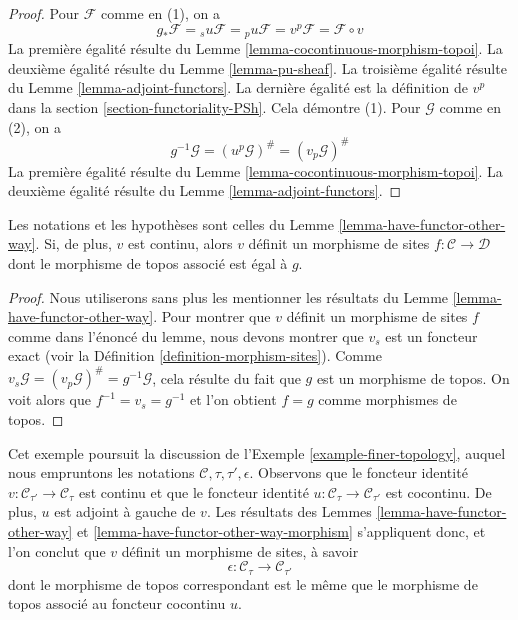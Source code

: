 \begin{proof}
Pour $\mathcal{F}$ comme en (1), on a
$$
g_*\mathcal{F} =
{}_su\mathcal{F} =
{}_pu\mathcal{F} =
v^p\mathcal{F} =
\mathcal{F} \circ v
$$
La première égalité résulte du Lemme \ref{lemma-cocontinuous-morphism-topoi}.
La deuxième égalité résulte du Lemme \ref{lemma-pu-sheaf}.
La troisième égalité résulte du Lemme \ref{lemma-adjoint-functors}.
La dernière égalité est la définition de $v^p$ dans la
section \ref{section-functoriality-PSh}. Cela démontre (1).
Pour $\mathcal{G}$ comme en (2), on a
$$
g^{-1}\mathcal{G} = (u^p\mathcal{G})^\# = (v_p\mathcal{G})^\#
$$
La première égalité résulte du Lemme \ref{lemma-cocontinuous-morphism-topoi}.
La deuxième égalité résulte du Lemme \ref{lemma-adjoint-functors}.
\end{proof}

\begin{lemma}
\label{lemma-have-functor-other-way-morphism}
Les notations et les hypothèses sont celles du
Lemme \ref{lemma-have-functor-other-way}.
Si, de plus, $v$ est continu, alors $v$ définit un morphisme de sites
$f : \mathcal{C} \to \mathcal{D}$ dont le morphisme de topos associé est égal
à $g$.
\end{lemma}

\begin{proof}
Nous utiliserons sans plus les mentionner les résultats du
Lemme \ref{lemma-have-functor-other-way}. Pour montrer que $v$ définit un
morphisme de sites $f$ comme dans l’énoncé du lemme, nous devons montrer que
$v_s$ est un foncteur exact (voir la
Définition \ref{definition-morphism-sites}). Comme
$v_s\mathcal{G} = (v_p\mathcal{G})^\# = g^{-1}\mathcal{G}$, cela résulte du
fait que $g$ est un morphisme de topos. On voit alors que
$f^{-1} = v_s = g^{-1}$ et l’on obtient $f = g$ comme morphismes de topos.
\end{proof}

\begin{example}
\label{example-finer-topology-bis}
Cet exemple poursuit la discussion de l’Exemple \ref{example-finer-topology},
auquel nous empruntons les notations $\mathcal{C}, \tau, \tau', \epsilon$.
Observons que le foncteur identité
$v : \mathcal{C}_{\tau'} \to \mathcal{C}_\tau$ est continu et que le foncteur
identité $u : \mathcal{C}_\tau \to \mathcal{C}_{\tau'}$ est cocontinu. De
plus, $u$ est adjoint à gauche de $v$. Les résultats des
Lemmes \ref{lemma-have-functor-other-way} et
\ref{lemma-have-functor-other-way-morphism} s’appliquent donc, et l’on conclut
que $v$ définit un morphisme de sites, à savoir
$$
\epsilon : \mathcal{C}_\tau \longrightarrow \mathcal{C}_{\tau'}
$$
dont le morphisme de topos correspondant est le même que le morphisme de topos
associé au foncteur cocontinu $u$.
\end{example}

